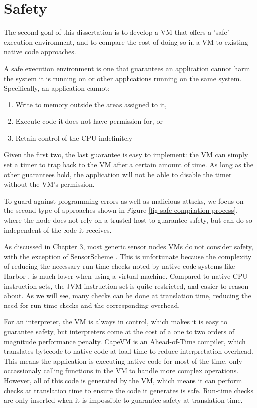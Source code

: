 \chapter{Safety}
\label{sec-safety}


The second goal of this dissertation is to develop a VM that offers a 'safe' execution environment, and to compare the cost of doing so in a VM to existing native code approaches.

A safe execution environment is one that guarantees an application cannot harm the system it is running on or other applications running on the same system. Specifically, an application cannot:
\begin{enumerate}
    \item Write to memory outside the areas assigned to it,
    \item Execute code it does not have permission for, or
    \item Retain control of the CPU indefinitely
\end{enumerate}

Given the first two, the last guarantee is easy to implement: the VM can simply set a timer to trap back to the VM after a certain amount of time. As long as the other guarantees hold, the application will not be able to disable the timer without the VM's permission.

To guard against programming errors as well as malicious attacks, we focus on the second type of approaches shown in Figure \ref{fig-safe-compilation-process}, where the node does not rely on a trusted host to guarantee safety, but can do so independent of the code it receives.

As discussed in Chapter 3, most generic sensor nodes VMs do not consider safety, with the exception of SensorScheme \cite{Evers:2010ur}. This is unfortunate because the complexity of reducing the necessary run-time checks noted by native code systems like Harbor \cite{Kumar:2007ge}, is much lower when using a virtual machine. Compared to native CPU instruction sets, the JVM instruction set is quite restricted, and easier to reason about. As we will see, many checks can be done at translation time, reducing the need for run-time checks and the corresponding overhead.

For an interpreter, the VM is always in control, which makes it is easy to guarantee safety, but interpreters come at the cost of a one to two orders of magnitude performance penalty. CapeVM is an Ahead-of-Time compiler, which translates bytecode to native code at load-time to reduce interpretation overhead. This means the application is executing native code for most of the time, only occassionaly calling functions in the VM to handle more complex operations. However, all of this code is generated by the VM, which means it can perform checks at translation time to ensure the code it generates is safe. Run-time checks are only inserted when it is impossible to guarantee safety at translation time.

